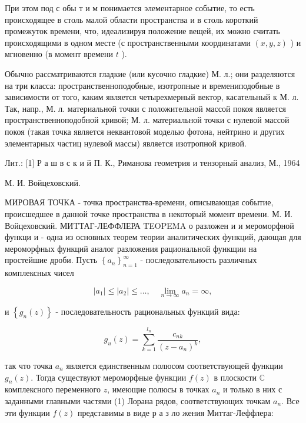 \documentclass[10pt]{article}
\begin{document}
При этом под с обы т и м понимается элементарное событие, то есть происходящее в столь малой области пространства и в столь короткий промежуток времени, что, идеализируя положение вещей, их можно считать происходящими в одном месте (с пространственными координатами $(x, y, z)$ ) и мгновенно (в момент времени $t$ ).



Обычно рассматриваются гладкие (или кусочно гладкие) М. л.; они разделяются на три класса: пространственноподобные, изотропные и времениподобные в зависимости от того, каким является четырехмерный вектор, касательный к М. л. Так, напр., М. л. материальной точки с положительной массой покоя является пространственноподобной кривой; М. л. материальной точки с нулевой массой покоя (такая точка является неквантовой моделью фотона, нейтрино и других элементарных частиц нулевой массы) является изотропной кривой.



Лит.: [1] Р а ш в с к и й П. К., Риманова геометрия и тензорный анализ, М., 1964



М. И. Войцеховский.



МИРОВАЯ ТОЧКА - точка пространства-времени, описывающая событие, происшедшее в данной точке пространства в некоторый момент времени. М. И. Войцеховский. МИTТАГ-ЛЕФФЛЕРА TEOPEMA $о$ разложен и и мероморфной функци и - одна из основных теорем теории аналитических функций, дающая для мероморфных функций аналог разложения рациональной функщии на простейшие дроби. Пусть $\left\{a_{n}\right\}_{n=1}^{\infty}$ - последовательность различных комплексных чисел



\[

\left|a_{1}\right| \leqslant\left|a_{2}\right| \leqslant \ldots, \quad \lim _{n \rightarrow \infty} a_{n}=\infty,

\]



и $\left\{g_{n}(z)\right\}$ - последовательность рациональных функций вида:



\[

g_{u}(z)=\sum_{k=1}^{l_{n}} \frac{c_{n k}}{\left(z-a_{n}\right)^{k}},

\]



так что точка $a_{n}$ является единственным полюсом соответствующей функции $g_{n}(z)$. Тогда существуют мероморфные функции $f(z)$ в плоскости $\mathbb{C}$ комплексного переменного $z$, имеющие полюсы в точках $a_{n}$ и только в них с заданными главными частями (1) Лорана рядов, соответствующих точкам $a_{n}$. Все эти функции $f(z)$ представимы в виде р а з ло жения Миттаг-Леффлера:
\end{document}
